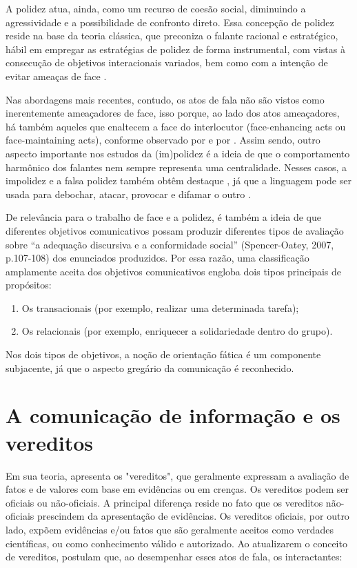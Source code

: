 \documentclass[portuguese]{textolivre}
\begin{document}
A polidez atua, ainda, como um recurso de coesão social, diminuindo a agressividade e a possibilidade de confronto direto. Essa concepção de polidez reside na base da teoria clássica, que preconiza o falante racional e estratégico, hábil em empregar as estratégias de polidez de forma instrumental, com vistas à consecução de objetivos interacionais variados, bem como com a intenção de evitar ameaças de face \cite{brown1987,leech2014}.

Nas abordagens mais recentes, contudo, os atos de fala não são vistos como inerentemente ameaçadores de face, isso porque, ao lado dos atos ameaçadores, há também aqueles que enaltecem a face do interlocutor (face-enhancing acts ou face-maintaining acts), conforme observado por \textcite{kerbrat1992} e por \textcite{leech2014}. Assim sendo, outro aspecto importante nos estudos da (im)polidez é a ideia de que o comportamento harmônico dos falantes nem sempre representa uma centralidade. Nesses casos, a impolidez e a falsa polidez também obtêm destaque \cite{culpeper2016}, já que a linguagem pode ser usada para debochar, atacar, provocar e difamar o outro \cite{Cunha2019,carneiro2020,cunha2020teorias}.

De relevância para o trabalho de face e a polidez, é também a ideia de que diferentes objetivos comunicativos possam produzir diferentes tipos de avaliação sobre “a adequação discursiva e a conformidade social” (Spencer-Oatey, 2007, p.107-108) dos enunciados produzidos. Por essa razão, uma classificação amplamente aceita dos objetivos comunicativos engloba dois tipos principais de propósitos: 
\begin{enumerate}
    \item Os transacionais (por exemplo, realizar uma determinada tarefa);
    \item Os relacionais (por exemplo, enriquecer a solidariedade dentro do grupo).
\end{enumerate}

Nos dois tipos de objetivos, a noção de orientação fática é um componente subjacente, já que o aspecto gregário da comunicação é reconhecido. 

\section{A comunicação de informação e os vereditos}\label{sec-fmt-manuscrito}
Em sua teoria, \textcite{austin1975} apresenta os "vereditos", que geralmente expressam a avaliação de fatos e de valores com base em evidências ou em crenças. Os vereditos podem ser oficiais ou não-oficiais. A principal diferença reside no fato que os vereditos não-oficiais prescindem da apresentação de evidências. Os vereditos oficiais, por outro lado, expõem evidências e/ou fatos que são geralmente aceitos como verdades científicas, ou como conhecimento válido e autorizado. Ao atualizarem o conceito de vereditos, \textcite[p. 80]{labinza2021} postulam que, ao desempenhar esses atos de fala, os interactantes:  
\end{document}
